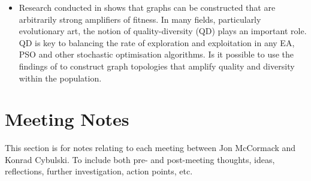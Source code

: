 \documentclass[10pt,a4paper]{article}
\begin{document}
\begin{itemize}
	\item Research conducted in \cite{graph-amplifiers} shows that graphs can be constructed that are arbitrarily strong amplifiers of fitness.
	In many fields, particularly evolutionary art, the notion of quality-diversity (QD) plays an important role.
	QD is key to balancing the rate of exploration and exploitation in any EA, PSO and other stochastic optimisation algorithms.
	Is it possible to use the findings of \cite{graph-amplifiers} to construct graph topologies that amplify quality and diversity within the population.
	
\end{itemize}

\pagebreak

\section{Meeting Notes}

This section is for notes relating to each meeting between Jon McCormack and Konrad Cybulski. To include both pre- and post-meeting thoughts, ideas, reflections, further investigation, action points, etc.
\\\\
\end{document}
